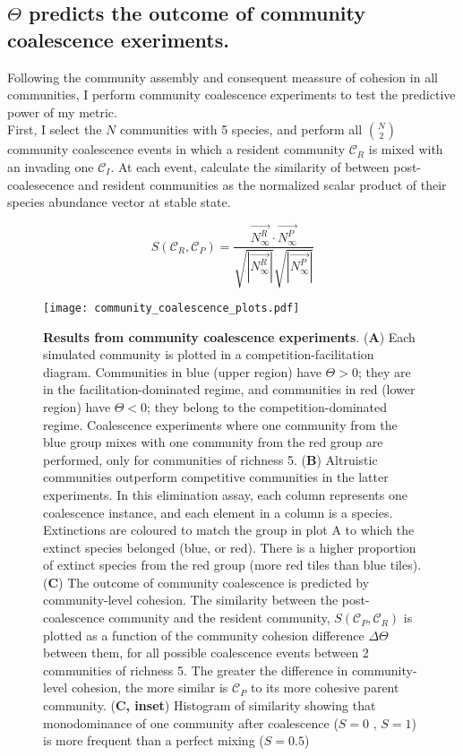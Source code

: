 \documentclass[titlepage,11pt]{article}
\begin{document}
\begin{linenumbers}
			\subsection{$ \Theta $ predicts the outcome of community coalescence exeriments.}
			Following the community assembly and consequent meassure of cohesion in all communities, I perform community coalescence experiments to test the predictive power of my metric.\\
			First, I select the $ N $ communities with 5 species, and perform all $ {N}\choose{2} $ community coalescence events in which a resident community $\mathcal{C}_R$ is mixed with an invading one $ \mathcal{C}_I $. At each event, calculate the similarity of between post-coalesecence  and resident communities as the normalized scalar product of their species abundance vector at stable state.
			\begin{linenomath*}
				\begin{equation}
				S(\mathcal{C}_R, \mathcal{C}_P) = \frac{\vec{N^R_{\infty}} \cdot \vec{N^P_{\infty}}}{\sqrt{|\vec{N^R_{\infty}}|}\sqrt{|\vec{N^P_{\infty}}|}}
				\end{equation}
			\end{linenomath*}
			\begin{figure}
				\centering			
				\texttt{[image: community\_coalescence\_plots.pdf]}
				\caption{\textbf{Results from community coalescence experiments}. (\textbf{A}) Each simulated community is plotted in a competition-facilitation diagram. Communities in blue (upper region) have $ \Theta > 0 $; they are in the facilitation-dominated regime, and communities in red  (lower region) have $ \Theta <0 $; they belong to the competition-dominated regime. Coalescence experiments where one community from the blue group mixes with one community from the red group are performed, only for communities of richness 5. (\textbf{B}) Altruistic communities outperform competitive communities in the latter experiments. In this elimination assay, each column represents one coalescence instance, and each element in a column is a species. Extinctions are coloured to match the group in plot A to which the extinct species belonged (blue, or red). There is a higher proportion of extinct species from the red group (more red tiles than blue tiles). (\textbf{C}) The outcome of community coalescence is predicted by community-level cohesion. The similarity between the post-coalescence community and the resident community, $ S (\mathcal{C}_P, \mathcal{C}_R) $ is plotted as a function of the community cohesion difference $ \Delta \Theta $ between them, for all possible coalescence events between 2 communities of richness 5. The greater the difference in community-level cohesion, the more similar is $ \mathcal{C}_P $ to its more cohesive parent community. (\textbf{C, inset}) Histogram of similarity showing that monodominance of one community after coalescence  ($ S = 0 \text{ , } S = 1 $) is more frequent than a perfect mixing ($ S = 0.5 $) }
				\label{fig:community_coalescence_results}
		\end{figure}
			

\end{linenumbers}
\end{document}
